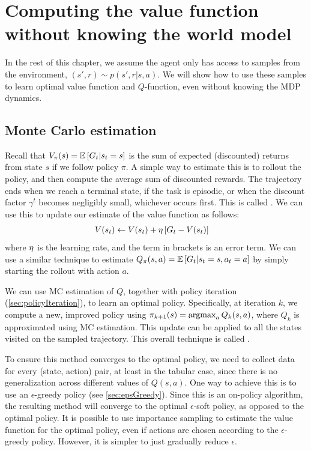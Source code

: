 \section{Computing the value function  without knowing the world model}

In the rest of this chapter,
we assume the agent only has  access to samples from
the environment, $(s',r) \sim p(s',r|s,a)$.
We will show how to use these samples
to learn optimal value function and $Q$-function,
even without knowing the MDP dynamics.



\subsection{Monte Carlo estimation}
\label{sec:MCRL}

Recall that $V_{\pi}(s) = \mathbb{E}\left[{G_t | s_t=s}\right]$
is the sum of expected (discounted) returns from state $s$
if we follow policy $\pi$.
A simple way to estimate this is to rollout the policy,
and then compute the average
sum of discounted rewards.  The trajectory ends when we reach a terminal state, if
the task is episodic, or when the discount factor $\gamma^t$ becomes
negligibly small, whichever occurs first.
This is called .
We can use this to update our estimate of the value function as follows:
\begin{align}
\label{eqn:rl-td}
V(s_t) &\leftarrow V(s_t) + \eta
\left[
 G_t  - V(s_t)
  \right]
\end{align}
where $\eta$ is the learning rate, and the term in brackets is an error term.
We can use a similar technique to estimate
$Q_{\pi}(s,a) = \mathbb{E}\left[{G_t | s_t=s,a_t=a}\right]$
by simply starting the rollout with action $a$.

We can use MC estimation of $Q$,  together with policy iteration
(\cref{sec:policyIteration}), to learn an optimal policy.
Specifically,
at iteration $k$,
we compute a new, improved policy using
$\policy_{k+1}(s) = \argmax_a Q_k(s,a)$,
where $Q_k$ is approximated using MC estimation.
This update can be applied to all the states visited
on the sampled trajectory.
This overall technique
is called .

To ensure this method converges to the optimal policy,
we need to collect data for every (state, action) pair,
at least in the tabular case,
since there is no generalization
across different values of $Q(s,a)$.
One way to achieve this is to use an $\epsilon$-greedy policy
 (see \cref{sec:epsGreedy}).
Since this is an on-policy algorithm,
the resulting method will converge
to the optimal $\epsilon$-soft policy,
as opposed to the optimal policy.
It is possible to use importance sampling
to estimate the value function for the optimal policy,
even if actions are chosen according to the $\epsilon$-greedy policy.
However, it is simpler to just gradually reduce $\epsilon$.

